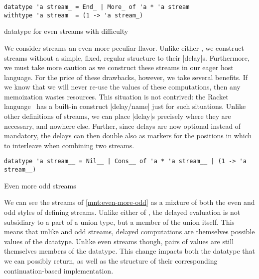 \documentclass[screen,anonymous,review,draft,natbib=false]{acmart} %
\begin{document}
\begin{listing}
\begin{verbatim}
datatype 'a stream_ = End_ | More_ of 'a * 'a stream
withtype 'a stream  = (1 -> 'a stream_)
\end{verbatim}
\caption{ datatype for even streams with difficulty}
\label{mnt:even-streams-with-difficulty}
\end{listing}

We consider streams an even more peculiar flavor. Unlike either
\citeauthor{wadler1998add,danvy2002unifying}, we construct streams
without a simple, fixed, regular structure to their
\rackinline|delay|s. Furthermore, we must take more caution as we
construct these streams in our eager host language. For the price of
these drawbacks, however, we take several benefits. If we know that we
will never re-use the values of these computations, then any
memoization wastes resources. This situation is not contrived: the
Racket language~\cite{flatt2010reference} has a built-in construct
\rackinline|delay/name| just for such situations. Unlike other
definitions of streams, we can place \rackinline|delay|s precisely
where they are necessary, and nowhere else. Further, since delays are
now optional instead of mandatory, the delays can then double also as
markers for the positions in which to interleave when combining two
streams.

\begin{listing}
\begin{verbatim}
datatype 'a stream__ = Nil__ | Cons__ of 'a * 'a stream__ | (1 -> 'a stream__)
\end{verbatim}
\caption{Even more odd streams}
\label{mnt:even-more-odd}
\end{listing}

We can see the streams of \cref{mnt:even-more-odd} as a mixture of
both the even and odd styles of defining streams. Unlike either of
, the delayed evaluation is not subsidiary to
a part of a union type, but a member of the union itself. This means
that unlike  and
\citeauthor{wadler1998add} odd streams, delayed computations are
themselves possible values of the datatype. Unlike
\citeauthor{wadler1998add} even streams though, pairs of values are
still themselves members of the datatype. This change impacts both the
datatype that we can possibly return, as well as the structure of
their corresponding continuation-based implementation.
\end{document}
